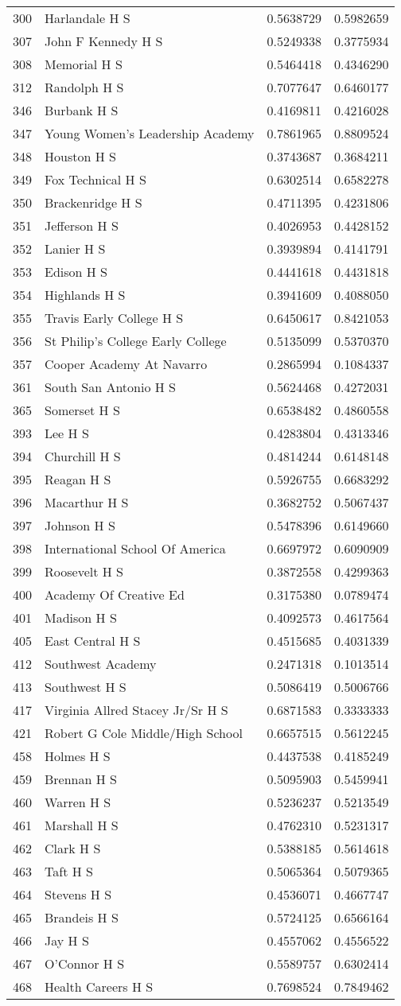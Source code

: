 \documentclass[
]{article}
\begin{document}
\begin{longtable}[]{@{}llrr@{}}
300 & Harlandale H S & 0.5638729 & 0.5982659\tabularnewline
307 & John F Kennedy H S & 0.5249338 & 0.3775934\tabularnewline
308 & Memorial H S & 0.5464418 & 0.4346290\tabularnewline
312 & Randolph H S & 0.7077647 & 0.6460177\tabularnewline
346 & Burbank H S & 0.4169811 & 0.4216028\tabularnewline
347 & Young Women's Leadership Academy & 0.7861965 &
0.8809524\tabularnewline
348 & Houston H S & 0.3743687 & 0.3684211\tabularnewline
349 & Fox Technical H S & 0.6302514 & 0.6582278\tabularnewline
350 & Brackenridge H S & 0.4711395 & 0.4231806\tabularnewline
351 & Jefferson H S & 0.4026953 & 0.4428152\tabularnewline
352 & Lanier H S & 0.3939894 & 0.4141791\tabularnewline
353 & Edison H S & 0.4441618 & 0.4431818\tabularnewline
354 & Highlands H S & 0.3941609 & 0.4088050\tabularnewline
355 & Travis Early College H S & 0.6450617 & 0.8421053\tabularnewline
356 & St Philip's College Early College & 0.5135099 &
0.5370370\tabularnewline
357 & Cooper Academy At Navarro & 0.2865994 & 0.1084337\tabularnewline
361 & South San Antonio H S & 0.5624468 & 0.4272031\tabularnewline
365 & Somerset H S & 0.6538482 & 0.4860558\tabularnewline
393 & Lee H S & 0.4283804 & 0.4313346\tabularnewline
394 & Churchill H S & 0.4814244 & 0.6148148\tabularnewline
395 & Reagan H S & 0.5926755 & 0.6683292\tabularnewline
396 & Macarthur H S & 0.3682752 & 0.5067437\tabularnewline
397 & Johnson H S & 0.5478396 & 0.6149660\tabularnewline
398 & International School Of America & 0.6697972 &
0.6090909\tabularnewline
399 & Roosevelt H S & 0.3872558 & 0.4299363\tabularnewline
400 & Academy Of Creative Ed & 0.3175380 & 0.0789474\tabularnewline
401 & Madison H S & 0.4092573 & 0.4617564\tabularnewline
405 & East Central H S & 0.4515685 & 0.4031339\tabularnewline
412 & Southwest Academy & 0.2471318 & 0.1013514\tabularnewline
413 & Southwest H S & 0.5086419 & 0.5006766\tabularnewline
417 & Virginia Allred Stacey Jr/Sr H S & 0.6871583 &
0.3333333\tabularnewline
421 & Robert G Cole Middle/High School & 0.6657515 &
0.5612245\tabularnewline
458 & Holmes H S & 0.4437538 & 0.4185249\tabularnewline
459 & Brennan H S & 0.5095903 & 0.5459941\tabularnewline
460 & Warren H S & 0.5236237 & 0.5213549\tabularnewline
461 & Marshall H S & 0.4762310 & 0.5231317\tabularnewline
462 & Clark H S & 0.5388185 & 0.5614618\tabularnewline
463 & Taft H S & 0.5065364 & 0.5079365\tabularnewline
464 & Stevens H S & 0.4536071 & 0.4667747\tabularnewline
465 & Brandeis H S & 0.5724125 & 0.6566164\tabularnewline
466 & Jay H S & 0.4557062 & 0.4556522\tabularnewline
467 & O'Connor H S & 0.5589757 & 0.6302414\tabularnewline
468 & Health Careers H S & 0.7698524 & 0.7849462\tabularnewline

\end{longtable}
\end{document}
